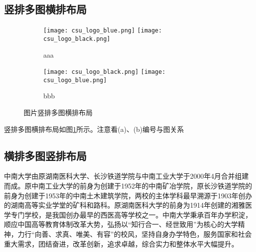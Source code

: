 \subsection{竖排多图横排布局}

\begin{figure}[!htb]
    \centering
    \begin{subfigure}[t]{0.13\linewidth}
        \captionsetup{justification=centering} 
        \begin{minipage}[b]{1\linewidth}
        \texttt{[image: csu\_logo\_blue.png]} 
        \vspace{-1ex} \vfill
        \texttt{[image: csu\_logo\_black.png]}
        \caption{aaa}
        \end{minipage}
    \end{subfigure}
    \begin{subfigure}[t]{0.13\linewidth}
        \captionsetup{justification=centering} 
        \begin{minipage}[b]{1\linewidth}
        \texttt{[image: csu\_logo\_black.png]} 
        \vspace{-1ex} \vfill
        \texttt{[image: csu\_logo\_blue.png]}
        \caption{bbb}
        \end{minipage}
    \end{subfigure}
    \caption{图片竖排多图横排布局}
    \label{f.csu_col_row}
\end{figure}

竖排多图横排布局如图\ref{f.csu_col_row}所示。注意看(a)、(b)编号与图关系


\subsection{横排多图竖排布局}

中南大学由原湖南医科大学、长沙铁道学院与中南工业大学于2000年4月合并组建而成。原中南工业大学的前身为创建于1952年的中南矿冶学院，原长沙铁道学院的前身为创建于1953年的中南土木建筑学院，两校的主体学科最早溯源于1903年创办的湖南高等实业学堂的矿科和路科。原湖南医科大学的前身为1914年创建的湘雅医学专门学校，是我国创办最早的西医高等学校之一。中南大学秉承百年办学积淀，顺应中国高等教育体制改革大势，弘扬以“知行合一、经世致用”为核心的大学精神，力行“向善、求真、唯美、有容”的校风，坚持自身办学特色，服务国家和社会重大需求，团结奋进，改革创新，追求卓越，综合实力和整体水平大幅提升。

